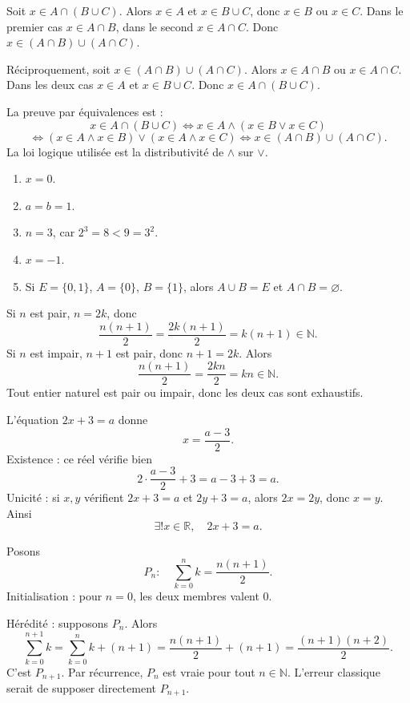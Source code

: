\documentclass[11pt,a4paper]{article}
\newcommand{\N}{\mathbb{N}}
\newcommand{\R}{\mathbb{R}}
\newcommand{\et}{\wedge}
\newcommand{\ou}{\vee}
\newcommand{\ssi}{\Longleftrightarrow}
\begin{document}
\begin{correctionbox}[METH 14]
Soit \(x\in A\cap(B\cup C)\). Alors \(x\in A\) et \(x\in B\cup C\), donc \(x\in B\) ou \(x\in C\). Dans le premier cas \(x\in A\cap B\), dans le second \(x\in A\cap C\). Donc \(x\in(A\cap B)\cup(A\cap C)\).

Réciproquement, soit \(x\in(A\cap B)\cup(A\cap C)\). Alors \(x\in A\cap B\) ou \(x\in A\cap C\). Dans les deux cas \(x\in A\) et \(x\in B\cup C\). Donc \(x\in A\cap(B\cup C)\).

La preuve par équivalences est :
\[
x\in A\cap(B\cup C)
\ssi x\in A\et(x\in B\ou x\in C)
\]
\[
\ssi (x\in A\et x\in B)\ou(x\in A\et x\in C)
\ssi x\in(A\cap B)\cup(A\cap C).
\]
La loi logique utilisée est la distributivité de \(\et\) sur \(\ou\).
\end{correctionbox}

\begin{correctionbox}[METH 15]
\begin{enumerate}[label=\alph*)]
    \item \(x=0\).
    \item \(a=b=1\).
    \item \(n=3\), car \(2^3=8<9=3^2\).
    \item \(x=-1\).
    \item Si \(E=\{0,1\}\), \(A=\{0\}\), \(B=\{1\}\), alors \(A\cup B=E\) et \(A\cap B=\varnothing\).
\end{enumerate}
\end{correctionbox}

\begin{correctionbox}[METH 16]
Si \(n\) est pair, \(n=2k\), donc
\[
\frac{n(n+1)}2=\frac{2k(n+1)}2=k(n+1)\in\N.
\]
Si \(n\) est impair, \(n+1\) est pair, donc \(n+1=2k\). Alors
\[
\frac{n(n+1)}2=\frac{2kn}{2}=kn\in\N.
\]
Tout entier naturel est pair ou impair, donc les deux cas sont exhaustifs.
\end{correctionbox}

\begin{correctionbox}[METH 17]
L'équation \(2x+3=a\) donne
\[
x=\frac{a-3}{2}.
\]
Existence : ce réel vérifie bien
\[
2\cdot\frac{a-3}{2}+3=a-3+3=a.
\]
Unicité : si \(x,y\) vérifient \(2x+3=a\) et \(2y+3=a\), alors \(2x=2y\), donc \(x=y\). Ainsi
\[
\exists!x\in\R,\quad 2x+3=a.
\]
\end{correctionbox}

\begin{correctionbox}[METH 18]
Posons
\[
P_n:\quad \sum_{k=0}^{n}k=\frac{n(n+1)}2.
\]
Initialisation : pour \(n=0\), les deux membres valent \(0\).

Hérédité : supposons \(P_n\). Alors
\[
\sum_{k=0}^{n+1}k=\sum_{k=0}^{n}k+(n+1)
=\frac{n(n+1)}2+(n+1)
=\frac{(n+1)(n+2)}2.
\]
C'est \(P_{n+1}\). Par récurrence, \(P_n\) est vraie pour tout \(n\in\N\). L'erreur classique serait de supposer directement \(P_{n+1}\).
\end{correctionbox}
\end{document}
